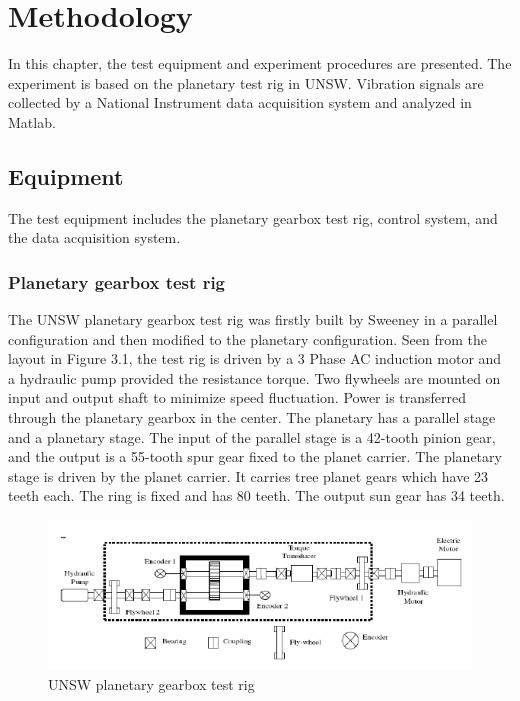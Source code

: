  \chapter{Methodology}\label{ch:methodology}

In this chapter, the test equipment and experiment procedures are presented. The experiment is based on the planetary test rig in UNSW. Vibration signals are collected by a National Instrument data acquisition system and analyzed in Matlab.

\section{Equipment}

The test equipment includes the planetary gearbox test rig, control system, and the data acquisition system.

\subsection{Planetary gearbox test rig}

The UNSW planetary gearbox test rig was firstly built by Sweeney in a parallel configuration and then modified to the planetary configuration. Seen from the layout in Figure 3.1, the test rig is driven by a 3 Phase AC induction motor and a hydraulic pump provided the resistance torque. Two flywheels are mounted on input and output shaft to minimize speed fluctuation.
Power is transferred through the planetary gearbox in the center. The planetary has a parallel stage and a planetary stage. The input of the parallel stage is a 42-tooth pinion gear, and the output is a 55-tooth spur gear fixed to the planet carrier. The planetary stage is driven by the planet carrier. It carries tree planet gears which have 23 teeth each. The ring is fixed and has 80 teeth. The output sun gear has 34 teeth.

\begin{figure}[h]
	\centering
	\includegraphics{rig}
	\caption{UNSW planetary gearbox test rig}
	\label{testrig}
\end{figure}


